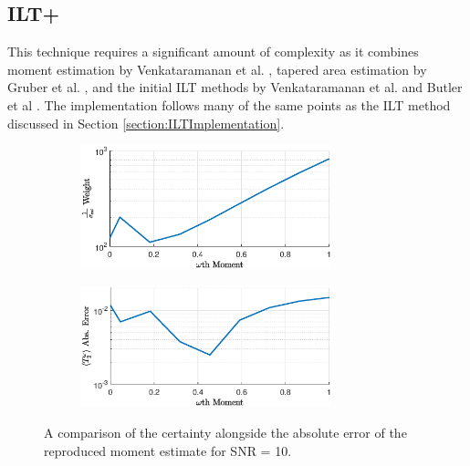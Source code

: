 \subsection{ILT+}
This technique requires a significant amount of complexity as it combines moment estimation by Venkataramanan et al. \cite{VenkMellin2010}, tapered area estimation by Gruber et al. \cite{GruberLinearFunctionals2013}, and the initial ILT methods by Venkataramanan et al. \cite{Venk2DFredholm2002} and Butler et al \cite{BulterReedsDawsonMethod1981}. The implementation follows many of the same points as the ILT method discussed in Section \ref{section:ILTImplementation}.

\begin{figure}[ht!]
    \centering
    \begin{subfigure}{1\textwidth}
        \centering
        \includegraphics[width=0.8\textwidth]{implementation/moment_weighting.eps}
    \label{fig:moment_estimator_weight}
    \end{subfigure}
    \begin{subfigure}{1\textwidth}
        \centering
        \includegraphics[width=0.8\textwidth]{implementation/moment_abs_error.eps}
        \label{fig:moment_estimator_abs_err}
    \end{subfigure}
    \caption{A comparison of the certainty alongside the absolute error of the reproduced moment estimate for SNR = 10.}
    \label{fig:problems_moment_est}
\end{figure}

